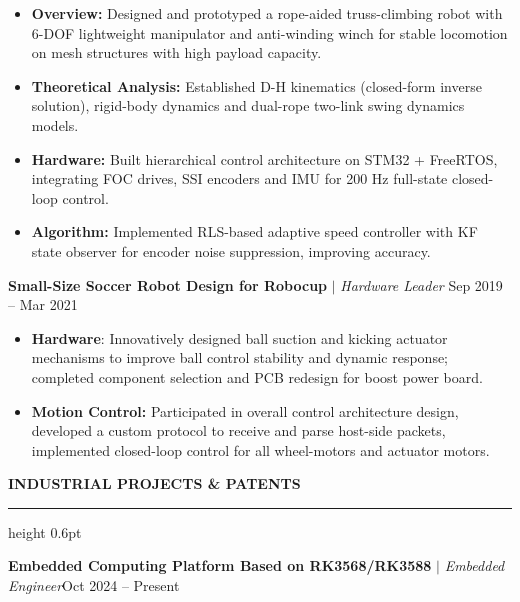 \documentclass[10pt,a4paper]{article}
\renewcommand{\section}[1]{
    \vspace{8pt}
    \noindent\textbf{\large\rmfamily\textcolor{sectionblue}{\MakeUppercase{#1}}}
    \vspace{4pt}
    \hrule height 0.6pt
    \vspace{8pt}
}
\begin{document}
\begin{itemize}[leftmargin=*, itemsep=0pt, parsep=0pt, topsep=2pt]
    \item \textbf{Overview: }Designed and prototyped a rope-aided truss-climbing robot with 6-DOF lightweight manipulator and anti-winding winch for stable locomotion on mesh structures with high payload capacity.
    \item \textbf{Theoretical Analysis: }Established D-H kinematics (closed-form inverse solution), rigid-body dynamics and dual-rope two-link swing dynamics models.
    \item \textbf{Hardware: }Built hierarchical control architecture on STM32 + FreeRTOS, integrating FOC drives, SSI encoders and IMU for 200 Hz full-state closed-loop control.
   \item  \textbf{Algorithm:} Implemented RLS-based adaptive speed controller with KF state observer for encoder noise suppression, improving accuracy.
\end{itemize}
\vspace{8pt}
\noindent
\textbf{Small-Size Soccer Robot Design for Robocup}  $\vert$ \textit{Hardware Leader} \hfill Sep 2019 -- Mar 2021
\begin{itemize}[leftmargin=*, itemsep=0pt, parsep=0pt, topsep=2pt]
    \item \textbf{Hardware}: Innovatively designed ball suction and kicking actuator mechanisms to improve ball control stability and dynamic response; completed component selection and PCB redesign for boost power board.
    \item \textbf{Motion Control: }Participated in overall control architecture design, developed a custom protocol to receive and parse host-side packets, implemented  closed-loop control for all wheel-motors and actuator motors.
\end{itemize}

\vspace{6pt}
\section{INDUSTRIAL PROJECTS \& Patents}

\noindent
\textbf{Embedded Computing Platform Based on RK3568/RK3588} $\vert$ \textit{Embedded Engineer}\hfill Oct 2024 -- Present
\end{document}
